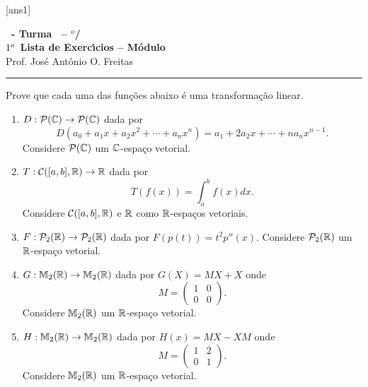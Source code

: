 \documentclass[12pt]{exam}
\begin{document}
  [ans1]
  \begin{center}
    {\Large\bf \disciplina\ - Turma \turma\ -- \semestre$^{o}$/\ano} \\ \vspace{9pt} {\large\bf
        $1^a$ Lista de Exerc{\'\i}cios -- Módulo \numeromodulo}\\ \vspace{9pt} Prof. Jos{\'e} Ant{\^o}nio O. Freitas
  \end{center}
  \hrule


\begin{exercicio}
  Prove que cada uma das fun\c{c}\~oes abaixo \'e uma transforma\c{c}\~ao linear.
  \begin{enumerate}[label={\alph*})]
    \item $D : \mathcal{P}(\mathbb{C}) \to \mathcal{P}(\mathbb{C})$ dada por
    \[
        D(a_0 + a_1x + a_2x^2 + \cdots + a_nx^n) = a_1 + 2a_2x + \cdots + na_nx^{n - 1}.
    \]
    Considere $\mathcal{P}(\mathbb{C})$ um $\mathbb{C}$-espa\c{c}o vetorial.

    \item $T : \mathcal{C}([a,b], \mathbb{R}) \to \mathbb{R}$ dada por
    \[
        T(f(x)) = \int_a^bf(x)dx.
    \]
    Considere $\mathcal{C}([a,b], \mathbb{R})$ e $\mathbb{R}$ como $\mathbb{R}$-espa\c{c}os vetoriais.

    \item $F : \mathcal{P}_2(\mathbb{R}) \to \mathcal{P}_2(\mathbb{R})$ dada por $F(p(t)) = t^2p''(x)$. Considere $\mathcal{P}_2(\mathbb{R})$ um $\mathbb{R}$-espa\c{c}o vetorial.

    \item $G : \mathbb{M}_2(\mathbb{R}) \to \mathbb{M}_2(\mathbb{R})$ dada por $G(X) = MX + X$ onde
    \[
        M = \begin{pmatrix}
                1 & 0\\
                0 & 0
            \end{pmatrix}.
    \]
    Considere $\mathbb{M}_2(\mathbb{R})$ um $\mathbb{R}$-espa\c{c}o vetorial.

    \item $H : \mathbb{M}_2(\mathbb{R}) \to \mathbb{M}_2(\mathbb{R})$ dada por $H(x) = MX - XM$ onde
    \[
        M = \begin{pmatrix}
                1 & 2\\
                0 & 1
            \end{pmatrix}.
    \]
    Considere $\mathbb{M}_2(\mathbb{R})$ um $\mathbb{R}$-espa\c{c}o vetorial.


\end{enumerate}
\end{exercicio}
\end{document}
